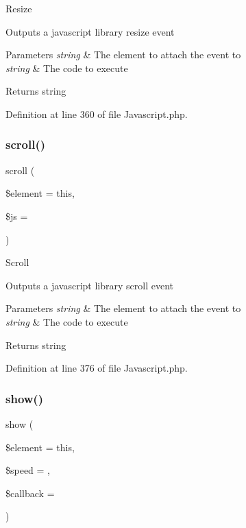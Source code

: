 Resize

Outputs a javascript library resize event


\begin{DoxyParams}{Parameters}
{\em string} & The element to attach the event to \\
\hline
{\em string} & The code to execute \\
\hline
\end{DoxyParams}
\begin{DoxyReturn}{Returns}
string 
\end{DoxyReturn}


Definition at line 360 of file Javascript.\+php.

\mbox{\label{class_c_i___javascript_acb749f777082c90c2b46eb1c367522dc}} 
\subsubsection{\texorpdfstring{scroll()}{scroll()}}
{\footnotesize\ttfamily scroll (\begin{DoxyParamCaption}\item[{}]{\$element = {\ttfamily \textquotesingle{}this\textquotesingle{}},  }\item[{}]{\$js = {\ttfamily \textquotesingle{}\textquotesingle{}} }\end{DoxyParamCaption})}

Scroll

Outputs a javascript library scroll event


\begin{DoxyParams}{Parameters}
{\em string} & The element to attach the event to \\
\hline
{\em string} & The code to execute \\
\hline
\end{DoxyParams}
\begin{DoxyReturn}{Returns}
string 
\end{DoxyReturn}


Definition at line 376 of file Javascript.\+php.

\mbox{\label{class_c_i___javascript_a37f187e47112ada2d8ffe4c840556178}} 
\subsubsection{\texorpdfstring{show()}{show()}}
{\footnotesize\ttfamily show (\begin{DoxyParamCaption}\item[{}]{\$element = {\ttfamily \textquotesingle{}this\textquotesingle{}},  }\item[{}]{\$speed = {\ttfamily \textquotesingle{}\textquotesingle{}},  }\item[{}]{\$callback = {\ttfamily \textquotesingle{}\textquotesingle{}} }\end{DoxyParamCaption})}

